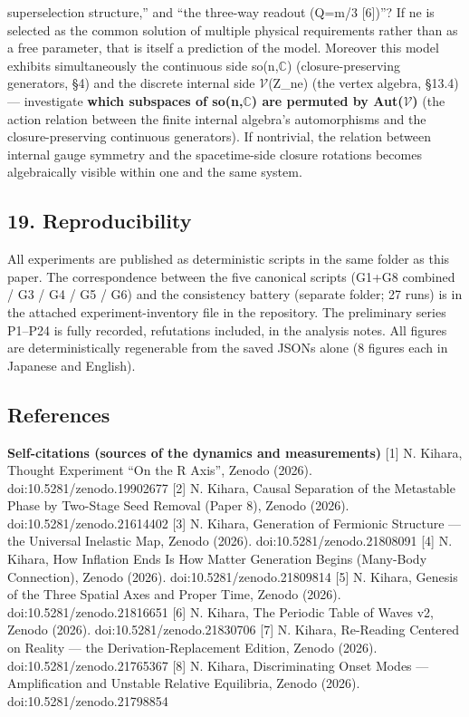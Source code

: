\documentclass[
]{article}
\begin{document}
\begin{enumerate}
  superselection structure,'' and ``the three-way readout (Q=m/3
  {[}6{]})''? If ne is selected as the common solution of multiple
  physical requirements rather than as a free parameter, that is itself
  a prediction of the model. Moreover this model exhibits simultaneously
  the continuous side so(n,\(\mathbb{C}\)) (closure-preserving
  generators, §4) and the discrete internal side \(\mathcal{V}\)(Z\_ne)
  (the vertex algebra, §13.4) --- investigate \textbf{which subspaces of
  so(n,\(\mathbb{C}\)) are permuted by Aut(\(\mathcal{V}\))} (the action
  relation between the finite internal algebra's automorphisms and the
  closure-preserving continuous generators). If nontrivial, the relation
  between internal gauge symmetry and the spacetime-side closure
  rotations becomes algebraically visible within one and the same
  system.
\end{enumerate}

\subsection{19. Reproducibility}\label{reproducibility}

All experiments are published as deterministic scripts in the same
folder as this paper. The correspondence between the five canonical
scripts (G1+G8 combined / G3 / G4 / G5 / G6) and the consistency battery
(separate folder; 27 runs) is in the attached experiment-inventory file
in the repository. The preliminary series P1--P24 is fully recorded,
refutations included, in the analysis notes. All figures are
deterministically regenerable from the saved JSONs alone (8 figures each
in Japanese and English).

\subsection{References}\label{references}

\textbf{Self-citations (sources of the dynamics and measurements)}
{[}1{]} N. Kihara, Thought Experiment ``On the R Axis'', Zenodo (2026).
doi:10.5281/zenodo.19902677 {[}2{]} N. Kihara, Causal Separation of the
Metastable Phase by Two-Stage Seed Removal (Paper 8), Zenodo (2026).
doi:10.5281/zenodo.21614402 {[}3{]} N. Kihara, Generation of Fermionic
Structure --- the Universal Inelastic Map, Zenodo (2026).
doi:10.5281/zenodo.21808091 {[}4{]} N. Kihara, How Inflation Ends Is How
Matter Generation Begins (Many-Body Connection), Zenodo (2026).
doi:10.5281/zenodo.21809814 {[}5{]} N. Kihara, Genesis of the Three
Spatial Axes and Proper Time, Zenodo (2026). doi:10.5281/zenodo.21816651
{[}6{]} N. Kihara, The Periodic Table of Waves v2, Zenodo (2026).
doi:10.5281/zenodo.21830706 {[}7{]} N. Kihara, Re-Reading Centered on
Reality --- the Derivation-Replacement Edition, Zenodo (2026).
doi:10.5281/zenodo.21765367 {[}8{]} N. Kihara, Discriminating Onset
Modes --- Amplification and Unstable Relative Equilibria, Zenodo (2026).
doi:10.5281/zenodo.21798854
\end{document}
